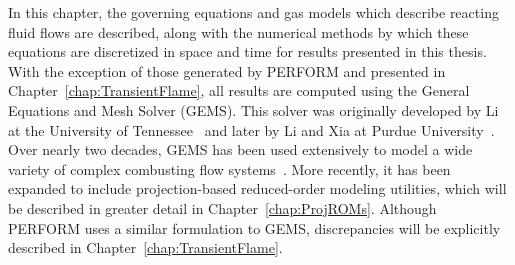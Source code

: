 
In this chapter, the governing equations and gas models which describe reacting fluid flows are described, along with the numerical methods by which these equations are discretized in space and time for results presented in this thesis. With the exception of those generated by PERFORM and presented in Chapter~\ref{chap:TransientFlame}, all results are computed using the General Equations and Mesh Solver (GEMS). This solver was originally developed by Li at the University of Tennessee~\cite{Li2001} and later by Li and Xia at Purdue University~\cite{Li2006}. Over nearly two decades, GEMS has been used extensively to model a wide variety of complex combusting flow systems~\cite{Xia2011,Huang2014,Comer2016}. More recently, it has been expanded to include projection-based reduced-order modeling utilities, which will be described in greater detail in Chapter~\ref{chap:ProjROMs}. Although PERFORM uses a similar formulation to GEMS, discrepancies will be explicitly described in Chapter~\ref{chap:TransientFlame}.